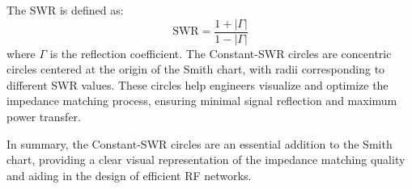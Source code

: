 The SWR is defined as:
\[
\text{SWR} = \frac{1 + |\Gamma|}{1 - |\Gamma|}
\]
where \(\Gamma\) is the reflection coefficient. The Constant-SWR circles are concentric circles centered at the origin of the Smith chart, with radii corresponding to different SWR values. These circles help engineers visualize and optimize the impedance matching process, ensuring minimal signal reflection and maximum power transfer.

In summary, the Constant-SWR circles are an essential addition to the Smith chart, providing a clear visual representation of the impedance matching quality and aiding in the design of efficient RF networks.

